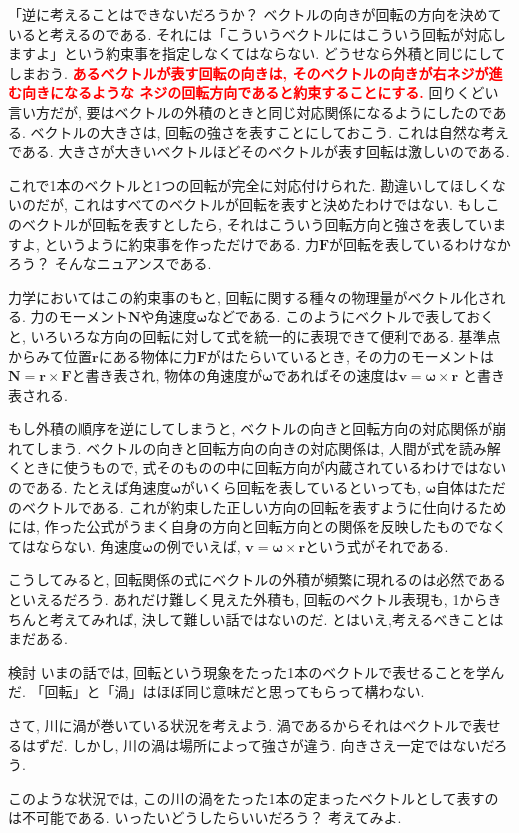 「逆に考えることはできないだろうか？ ベクトルの向きが回転の方向を決めていると考えるのである. 
それには「こういうベクトルにはこういう回転が対応しますよ」という約束事を指定しなくてはならない. 
どうせなら外積と同じにしてしまおう. 
\textbf{\textcolor{red}{あるベクトルが表す回転の向きは, そのベクトルの向きが右ネジが進む向きになるような
ネジの回転方向であると約束することにする.}}
回りくどい言い方だが, 要はベクトルの外積のときと同じ対応関係になるようにしたのである. 
ベクトルの大きさは, 回転の強さを表すことにしておこう. これは自然な考えである. 
大きさが大きいベクトルほどそのベクトルが表す回転は激しいのである. 

これで1本のベクトルと1つの回転が完全に対応付けられた. 
勘違いしてほしくないのだが, これはすべてのベクトルが回転を表すと決めたわけではない. 
もしこのベクトルが回転を表すとしたら, それはこういう回転方向と強さを表していますよ, 
というように約束事を作っただけである. 
力$\bm{F}$が回転を表しているわけなかろう？ そんなニュアンスである. 

力学においてはこの約束事のもと, 回転に関する種々の物理量がベクトル化される. 
力のモーメント$\bm{N}$や角速度$\bm{\omega}$などである. 
このようにベクトルで表しておくと, いろいろな方向の回転に対して式を統一的に表現できて便利である. 
基準点からみて位置$\bm{r}$にある物体に力$\bm{F}$がはたらいているとき, 
その力のモーメントは$\bm{N}=\bm{r}\times\bm{F}$と書き表され, 
物体の角速度が$\bm{\omega}$であればその速度は$\bm{v}=\bm{\omega}\times\bm{r}$
と書き表される. 

もし外積の順序を逆にしてしまうと, ベクトルの向きと回転方向の対応関係が崩れてしまう. 
ベクトルの向きと回転方向の向きの対応関係は, 人間が式を読み解くときに使うもので, 
式そのものの中に回転方向が内蔵されているわけではないのである. 
たとえば角速度$\bm{\omega}$がいくら回転を表しているといっても, 
$\bm{\omega}$自体はただのベクトルである. 
これが約束した正しい方向の回転を表すように仕向けるためには, 
作った公式がうまく自身の方向と回転方向との関係を反映したものでなくてはならない. 
角速度$\bm{\omega}$の例でいえば, $\bm{v}=\bm{\omega}\times\bm{r}$という式がそれである. 

こうしてみると, 回転関係の式にベクトルの外積が頻繁に現れるのは必然であるといえるだろう. 
あれだけ難しく見えた外積も, 回転のベクトル表現も, 
1からきちんと考えてみれば, 決して難しい話ではないのだ. とはいえ,考えるべきことはまだある. 
\begin{itembox}[l]{検討}
いまの話では, 回転という現象をたった1本のベクトルで表せることを学んだ. 
「回転」と「渦」はほぼ同じ意味だと思ってもらって構わない. 

さて, 川に渦が巻いている状況を考えよう. 渦であるからそれはベクトルで表せるはずだ. 
しかし, 川の渦は場所によって強さが違う. 向きさえ一定ではないだろう. 

このような状況では, この川の渦をたった1本の定まったベクトルとして表すのは不可能である. 
いったいどうしたらいいだろう？ 考えてみよ. 
\end{itembox}

